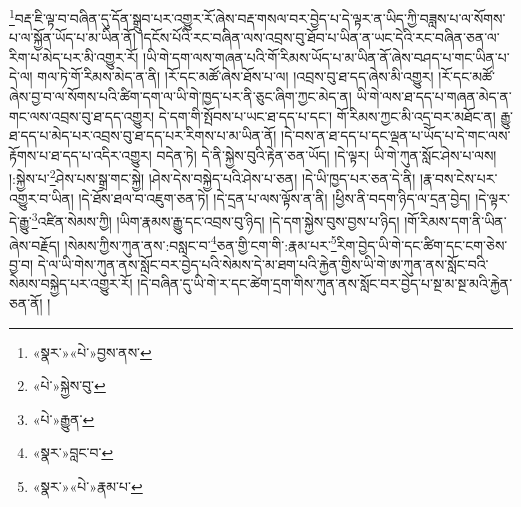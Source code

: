 \footnote{«སྣར་»«པེ་»བྱས་ནས་}བརྡ་ཇི་ལྟ་བ་བཞིན་དུ་དོན་སྒྲུབ་པར་འགྱུར་རོ་ཞེས་བརྡ་གསལ་བར་བྱེད་པ་དེ་ལྟར་ན་ཡིད་ཀྱི་བཟླས་པ་ལ་སོགས་པ་ལ་སྐྱོན་ཡོད་པ་མ་ཡིན་ནོ། །དངོས་པོའི་རང་བཞིན་ལས་འབྲས་བུ་ཐོབ་པ་ཡིན་ན་ཡང་དེའི་རང་བཞིན་ཅན་ལ་རིག་པ་མེད་པར་མི་འགྱུར་རོ། །ཡི་གེ་དག་ལས་གཞན་པའི་གོ་རིམས་ཡོད་པ་མ་ཡིན་ནོ་ཞེས་བཤད་པ་གང་ཡིན་པ་དེ་ལ། གལ་ཏེ་གོ་རིམས་མེད་ན་ནི། །རོ་དང་མཚོ་ཞེས་ཐོས་པ་ལ། །འབྲས་བུ་ཐ་དད་ཞེས་མི་འགྱུར། །རོ་དང་མཚོ་ཞེས་བྱ་བ་ལ་སོགས་པའི་ཚིག་དག་ལ་ཡི་གེ་ཁྱད་པར་ནི་ཅུང་ཞིག་ཀྱང་མེད་ན། ཡི་གེ་ལས་ཐ་དད་པ་གཞན་མེད་ན་གང་ལས་འབྲས་བུ་ཐ་དད་འགྱུར། དེ་དག་གི་སྤོབས་པ་ཡང་ཐ་དད་པ་དང་། གོ་རིམས་ཀྱང་མི་འདྲ་བར་མཐོང་ན། རྒྱུ་ཐ་དད་པ་མེད་པར་འབྲས་བུ་ཐ་དད་པར་རིགས་པ་མ་ཡིན་ནོ། །དེ་བས་ན་ཐ་དད་པ་དང་ལྡན་པ་ཡོད་པ་དེ་གང་ལས་རྟོགས་པ་ཐ་དད་པ་འདིར་འགྱུར། བདེན་ཏེ། དེ་ནི་སྐྱེས་བུའི་རྟེན་ཅན་ཡོད། །དེ་ལྟར། ཡི་གེ་ཀུན་སློང་ཤེས་པ་ལས། །:སྐྱེས་པ་\footnote{«པེ་»སྐྱེས་བུ་}ཤེས་པས་སྒྲ་གང་སྐྱེ། །ཤེས་དེས་བསྐྱེད་པའི་ཤེས་པ་ཅན། །དེ་ཡི་ཁྱད་པར་ཅན་དེ་ནི། །རྣ་བས་ངེས་པར་འགྱུར་བ་ཡིན། །དེ་ཐོས་ཐལ་བ་འཇུག་ཅན་ཏེ། །དེ་དྲན་པ་ལས་ལྟོས་ན་ནི། །ཕྱིས་ནི་བདག་ཉིད་ལ་དྲན་བྱེད། །དེ་ལྟར་དེ་རྒྱུ་\footnote{«པེ་»རྒྱུན་}འཛིན་སེམས་ཀྱི། །ཡིག་རྣམས་རྒྱུ་དང་འབྲས་བུ་ཉིད། །དེ་དག་སྐྱེས་བུས་བྱས་པ་ཉིད། །གོ་རིམས་དག་ནི་ཡིན་ཞེས་བརྗོད། །སེམས་ཀྱིས་ཀུན་ནས་:བསླང་བ་\footnote{«སྣར་»བླང་བ་}ཅན་གྱི་ངག་གི་:རྣམ་པར་\footnote{«སྣར་»«པེ་»རྣམ་པ་}རིག་བྱེད་ཡི་གེ་དང་ཚིག་དང་ངག་ཅེས་བྱ་བ། དེ་ལ་ཡི་གེས་ཀུན་ནས་སློང་བར་བྱེད་པའི་སེམས་དེ་མ་ཐག་པའི་རྐྱེན་གྱིས་ཡི་གེ་ཨ་ཀུན་ནས་སློང་བའི་སེམས་བསྐྱེད་པར་འགྱུར་རོ། །དེ་བཞིན་དུ་ཡི་གེ་ར་དང་ཚེག་དྲག་གིས་ཀུན་ནས་སློང་བར་བྱེད་པ་སྔ་མ་སྔ་མའི་རྐྱེན་ཅན་ནོ། །
